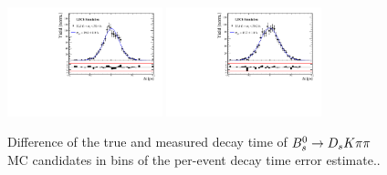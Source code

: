 \begin{figure}[h]
\includegraphics[height=!,width=0.4\textwidth]{figs/Resolution/SignalMC_bin_7.pdf}
\includegraphics[height=!,width=0.4\textwidth]{figs/Resolution/SignalMC_bin_8.pdf}
\caption{Difference of the true and measured decay time of ${{B}^0_{s}}\rightarrow{\ensuremath{{D}_{s}}}{\ensuremath{K}}{\ensuremath{\pi}}{\ensuremath{\pi}}$ MC candidates in bins of the per-event decay time error estimate..}
\label{fig:}
\end{figure}



\clearpage

